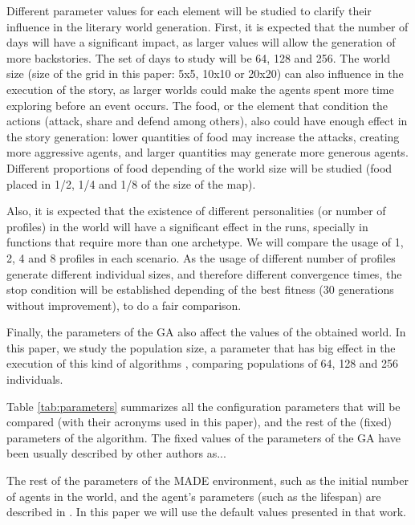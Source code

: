 \documentclass[runningheads,a4paper]{llncs}
\begin{document}

Different parameter values for each element will be studied to clarify
their influence in the literary world generation. First, it is
expected that the number of days will have a significant impact, as
larger values will allow the generation of more backstories. The set
of days to study will be 64, 128 and 256. The world size (size of the
grid in this paper: 5x5, 10x10 or 20x20) can also influence in the
execution of the story, as larger worlds could make the agents spent
more time exploring before an event occurs. The food, or the element
that condition the actions (attack, share and defend among others),
also could have enough effect in the story generation: lower
quantities of food may increase the attacks, creating more aggressive
agents, and larger quantities may generate more generous
agents. Different proportions of food depending of the world size will
be studied (food placed in 1/2, 1/4 and 1/8 of the size of the map). 

Also, it is expected that the existence of different personalities (or number of profiles) in the world will have a significant effect in the runs, specially in functions that require more than one archetype. We will compare the usage of 1, 2, 4 and 8 profiles in each scenario. As the usage of different number of profiles generate different
individual sizes, and therefore different convergence times, the stop
condition will be established depending of the best fitness (30 generations without improvement), to do a fair comparison.

Finally, the parameters of the GA also affect the values of the
obtained world. In this paper, we study the population size, a
parameter that has big effect in the execution of this kind of
algorithms \cite{}, comparing populations of 64, 128 and 256
individuals. %

Table \ref{tab:parameters} summarizes all the configuration parameters that will be compared (with their acronyms used in this paper), and the rest of the (fixed) parameters of the algorithm. The fixed values of the parameters of the GA have been usually described by other authors as...

The rest of the parameters of the MADE environment, such as the initial number of agents in the world, and the agent's parameters (such as the lifespan) are described in \cite{garcia14my}. In this paper we will use the default values presented in that work.
\end{document}
